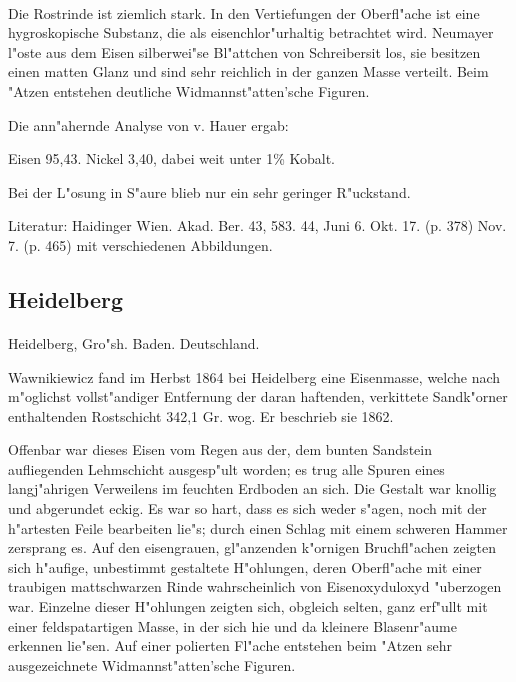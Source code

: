\documentclass[a4paper, 11pt, oneside]{article}
\begin{document}
\paragraph{}
Die Rostrinde ist ziemlich stark. In den Vertiefungen der Oberfl"ache ist eine hygroskopische Substanz, die als eisenchlor"urhaltig betrachtet wird. Neumayer l"oste aus dem Eisen silberwei"se Bl"attchen von Schreibersit los, sie besitzen einen matten Glanz und sind sehr reichlich in der ganzen Masse verteilt. Beim "Atzen entstehen deutliche Widmannst"atten'sche Figuren.

Die ann"ahernde Analyse von v. Hauer ergab:

Eisen 95,43.
Nickel 3,40, dabei weit unter 1\% Kobalt.

Bei der L"osung in S"aure blieb nur ein sehr geringer R"uckstand.

\footnotesize
Literatur: Haidinger Wien. Akad. Ber. 43, 583. 44, Juni 6. Okt. 17. (p. 378) Nov. 7. (p. 465) mit verschiedenen Abbildungen.

\subsection{Heidelberg}
\normalsize
\paragraph{}
Heidelberg, Gro"sh. Baden. Deutschland.

Wawnikiewicz fand im Herbst 1864 bei Heidelberg eine Eisenmasse, welche nach m"oglichst vollst"andiger Entfernung der daran haftenden, verkittete Sandk"orner enthaltenden Rostschicht 342,1 Gr. wog. Er beschrieb sie 1862.

Offenbar war dieses Eisen vom Regen aus der, dem bunten Sandstein aufliegenden Lehmschicht ausgesp"ult worden; es trug alle Spuren eines langj"ahrigen Verweilens im feuchten Erdboden an sich. Die Gestalt war knollig und abgerundet eckig. Es war so hart, dass es sich weder s"agen, noch mit der h"artesten Feile bearbeiten lie"s; durch einen Schlag mit einem schweren Hammer zersprang es. Auf den eisengrauen, gl"anzenden k"ornigen Bruchfl"achen zeigten sich h"aufige, unbestimmt gestaltete H"ohlungen, deren Oberfl"ache mit einer traubigen mattschwarzen Rinde wahrscheinlich von Eisenoxyduloxyd "uberzogen war. Einzelne dieser H"ohlungen zeigten sich, obgleich selten, ganz erf"ullt mit einer feldspatartigen Masse, in der sich hie und da kleinere Blasenr"aume erkennen lie"sen. Auf einer polierten Fl"ache entstehen beim "Atzen sehr ausgezeichnete Widmannst"atten'sche Figuren.
\end{document}
